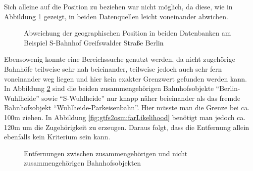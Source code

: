 Sich alleine auf die Position zu beziehen war nicht möglich, da diese, wie in Abbildung \ref{fig:gtfs2osm:geoDiff} gezeigt, in beiden Datenquellen leicht voneinander abwichen.
\begin{figure}[htb]
   \centering
   \caption{Abweichung der geographischen Position in beiden Datenbanken am Beispiel S-Bahnhof Greifswalder Straße Berlin}
   \label{fig:gtfs2osm:geoDiff}
 \end{figure}
Ebensowenig konnte eine Bereichssuche genutzt werden, da nicht zugehörige Bahnhöfe teilweise sehr nah beieinander, teilweise jedoch auch sehr fern voneinander weg liegen und hier kein exakter Grenzwert gefunden werden kann. In Abbildung \ref{fig:gtfs2osm:nearNameDiff} sind die beiden zusammengehörigen Bahnhofsobjekte ``Berlin-Wuhlheide'' sowie ``S-Wuhlheide'' nur knapp näher beieinander als das fremde Bahnhofsobjekt ``Wuhlheide-Parkeisenbahn''. Hier müsste man die Grenze bei ca. 100m ziehen. In Abbildung \ref{fig:gtfs2osm:farLikelihood} benötigt man jedoch ca. 120m um die Zugehörigkeit zu erzeugen. Daraus folgt, dass die Entfernung allein ebenfalls kein Kriterium sein kann.
\begin{figure}[htb]
   \centering
   \caption{Entfernungen zwischen zusammengehörigen und nicht zusammengehörigen Bahnhofsobjekten}
   \label{fig:gtfs2osm:nearNameDiff}
 \end{figure}

